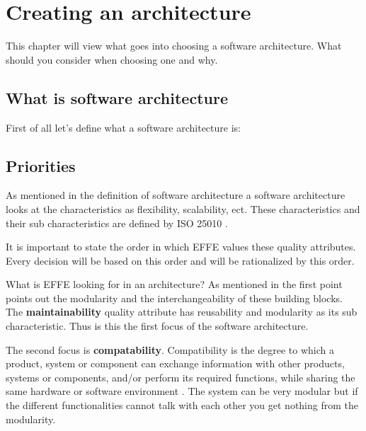 \chapter{Creating an architecture}

This chapter will view what goes into choosing a software architecture. What should you consider when choosing one and why.

\section{What is software architecture}
\label{sec:WhatIsSoftwareArchitecture}

First of all let's define what a software architecture is:


\section{Priorities}

As mentioned in the definition of software architecture  a software architecture looks at the characteristics as flexibility, scalability, ect. These characteristics and their sub characteristics are defined by ISO 25010 \cite{iso25010}.

It is important to state the order in which EFFE values these quality attributes. Every decision will be based on this order and will be rationalized by this order.

What is EFFE looking for in an architecture? As mentioned in  the first point points out the modularity and the interchangeability of these building blocks. The \textbf{maintainability} quality attribute has reusability and modularity as its sub characteristic. Thus is this the first focus of the software architecture.

The second focus is \textbf{compatability}. Compatibility is the degree to which a product, system or component can exchange information with other products, systems or components, and/or perform its required functions, while sharing the same hardware or software environment \cite{iso25010}. The system can be very modular but if the different functionalities cannot talk with each other you get nothing from the modularity.

